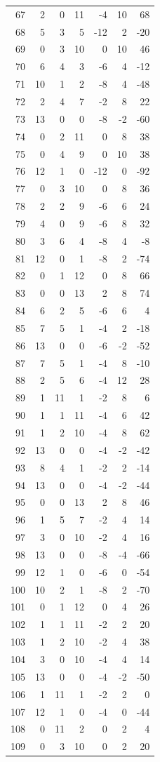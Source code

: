 \documentclass[11pt]{article}
\begin{document}
\begin{center}
\begin{longtable}{r r r r r r r}
67 & 2 & 0 & 11 & -4 & 10 & 68\\
68 & 5 & 3 & 5 & -12 & 2 & -20\\
69 & 0 & 3 & 10 & 0 & 10 & 46\\
70 & 6 & 4 & 3 & -6 & 4 & -12\\
71 & 10 & 1 & 2 & -8 & 4 & -48\\
72 & 2 & 4 & 7 & -2 & 8 & 22\\
73 & 13 & 0 & 0 & -8 & -2 & -60\\
74 & 0 & 2 & 11 & 0 & 8 & 38\\
75 & 0 & 4 & 9 & 0 & 10 & 38\\
76 & 12 & 1 & 0 & -12 & 0 & -92\\
77 & 0 & 3 & 10 & 0 & 8 & 36\\
78 & 2 & 2 & 9 & -6 & 6 & 24\\
79 & 4 & 0 & 9 & -6 & 8 & 32\\
80 & 3 & 6 & 4 & -8 & 4 & -8\\
81 & 12 & 0 & 1 & -8 & 2 & -74\\
82 & 0 & 1 & 12 & 0 & 8 & 66\\
83 & 0 & 0 & 13 & 2 & 8 & 74\\
84 & 6 & 2 & 5 & -6 & 6 & 4\\
85 & 7 & 5 & 1 & -4 & 2 & -18\\
86 & 13 & 0 & 0 & -6 & -2 & -52\\
87 & 7 & 5 & 1 & -4 & 8 & -10\\
88 & 2 & 5 & 6 & -4 & 12 & 28\\
89 & 1 & 11 & 1 & -2 & 8 & 6\\
90 & 1 & 1 & 11 & -4 & 6 & 42\\
91 & 1 & 2 & 10 & -4 & 8 & 62\\
92 & 13 & 0 & 0 & -4 & -2 & -42\\
93 & 8 & 4 & 1 & -2 & 2 & -14\\
94 & 13 & 0 & 0 & -4 & -2 & -44\\
95 & 0 & 0 & 13 & 2 & 8 & 46\\
96 & 1 & 5 & 7 & -2 & 4 & 14\\
97 & 3 & 0 & 10 & -2 & 4 & 16\\
98 & 13 & 0 & 0 & -8 & -4 & -66\\
99 & 12 & 1 & 0 & -6 & 0 & -54\\
100 & 10 & 2 & 1 & -8 & 2 & -70\\
101 & 0 & 1 & 12 & 0 & 4 & 26\\
102 & 1 & 1 & 11 & -2 & 2 & 20\\
103 & 1 & 2 & 10 & -2 & 4 & 38\\
104 & 3 & 0 & 10 & -4 & 4 & 14\\
105 & 13 & 0 & 0 & -4 & -2 & -50\\
106 & 1 & 11 & 1 & -2 & 2 & 0\\
107 & 12 & 1 & 0 & -4 & 0 & -44\\
108 & 0 & 11 & 2 & 0 & 2 & 4\\
109 & 0 & 3 & 10 & 0 & 2 & 20\\
\bottomrule\end{longtable}
\end{center}
\end{document}
